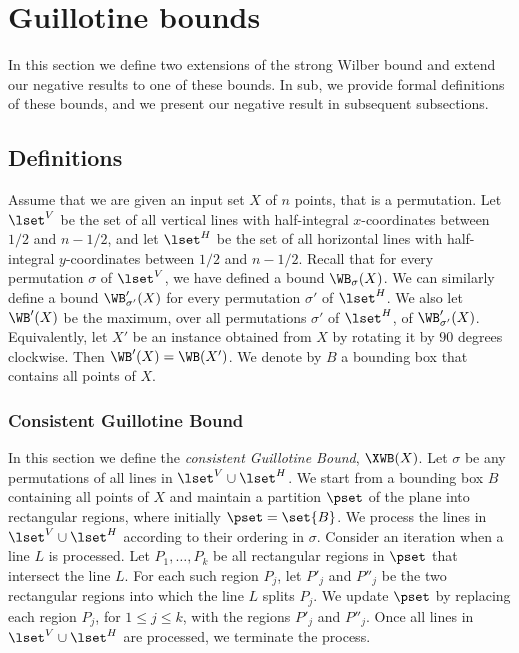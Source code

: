 \documentclass{toc}
\begin{document}
%

%

%

%
%
%
%
\section{Guillotine bounds}\label{sec: extension to extended}
%
%
%
%

In this section we define two extensions of the strong Wilber bound and extend our negative results to  one of these bounds.
%
In sub, we provide formal definitions of these bounds, and we present our negative result in subsequent subsections.  
 
\subsection{Definitions} 
\label{subsec: defs} 


Assume that we are given an input set $X$ of $n$ points, that is a permutation. Let $\lset^V$ be the set of all vertical lines with half-integral $x$-coordinates between $1/2$ and $n-1/2$, and let $\lset^H$ be the set of all horizontal lines with half-integral $y$-coordinates between $1/2$ and $n-1/2$. Recall that for every permutation $\sigma$ of $\lset^V$, we have defined a bound $\WB_{\sigma}(X)$. We can similarly define a bound $\WB'_{\sigma'}(X)$ for every permutation $\sigma'$ of $\lset^H$. We also let $\WB'(X)$ be the maximum, over all permutations $\sigma'$ of $\lset^H$, of $\WB'_{\sigma'}(X)$. Equivalently, let $X'$ be an instance obtained from $X$ by rotating it by $90$ degrees clockwise. Then $\WB'(X)=\WB(X')$. We denote by $B$ a bounding box that contains all points of $X$.

\subsubsection{Consistent Guillotine Bound}


In this section we define the \emph{consistent Guillotine Bound}, $\XWB(X)$. Let $\sigma$ be any permutations of all lines in $\lset^V\cup \lset^H$. 
We start from a bounding box $B$ containing all points of $X$ and maintain a partition $\pset$ of the plane into rectangular regions, where initially $\pset = \set{B}$.  
We process the lines in $\lset^V \cup \lset^H$ according to their ordering in $\sigma$. 
Consider an iteration when a line $L$ is processed. Let $P_1,\ldots, P_k$ be all rectangular regions in $\pset$ that intersect the line $L$. For each such region $P_j$, let $P'_j$ and $P''_j$ be the two rectangular regions into which the line $L$ splits $P_j$. 
We update $\pset$ by replacing each region $P_j$, for $1\leq j\leq k$, with the regions $P'_j$ and $P''_j$. 
Once all lines in $\lset^V\cup \lset^H$ are processed, we terminate the process.
\end{document}
